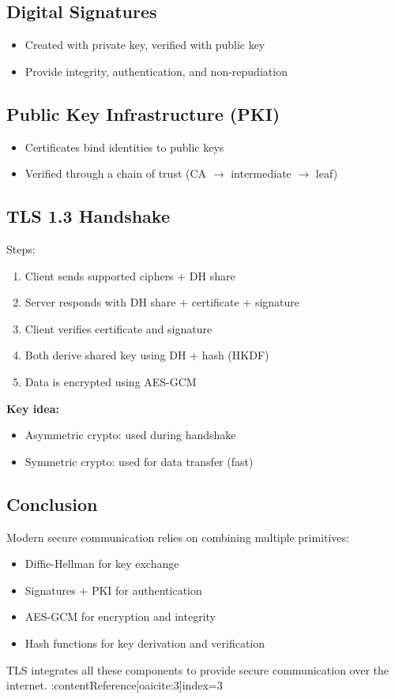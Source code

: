 \subsection{Digital Signatures}
\begin{itemize}
    \item Created with private key, verified with public key
    \item Provide integrity, authentication, and non-repudiation
\end{itemize}

\subsection{Public Key Infrastructure (PKI)}
\begin{itemize}
    \item Certificates bind identities to public keys
    \item Verified through a chain of trust (CA $\rightarrow$ intermediate $\rightarrow$ leaf)
\end{itemize}

\subsection{TLS 1.3 Handshake}
Steps:
\begin{enumerate}
    \item Client sends supported ciphers + DH share
    \item Server responds with DH share + certificate + signature
    \item Client verifies certificate and signature
    \item Both derive shared key using DH + hash (HKDF)
    \item Data is encrypted using AES-GCM
\end{enumerate}

\textbf{Key idea:}
\begin{itemize}
    \item Asymmetric crypto: used during handshake
    \item Symmetric crypto: used for data transfer (fast)
\end{itemize}

\subsection{Conclusion}
Modern secure communication relies on combining multiple primitives:
\begin{itemize}
    \item Diffie-Hellman for key exchange
    \item Signatures + PKI for authentication
    \item AES-GCM for encryption and integrity
    \item Hash functions for key derivation and verification
\end{itemize}

TLS integrates all these components to provide secure communication over the internet. :contentReference[oaicite:3]{index=3}